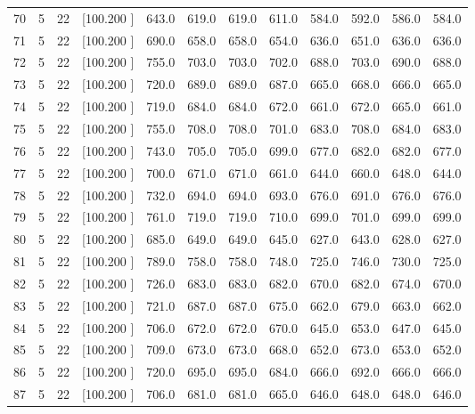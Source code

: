 \documentclass[12pt,a4paper]{article}
\begin{document}
\begin{center}
{\begin{tabular}{r r r r r r r r r r r r}
  70&  5& 22&[100.200   ]&   643.0&   619.0&   619.0&   611.0&   584.0&   592.0&   586.0&   584.0\\[-0.02in]
  71&  5& 22&[100.200   ]&   690.0&   658.0&   658.0&   654.0&   636.0&   651.0&   636.0&   636.0\\[-0.02in]
  72&  5& 22&[100.200   ]&   755.0&   703.0&   703.0&   702.0&   688.0&   703.0&   690.0&   688.0\\[-0.02in]
  73&  5& 22&[100.200   ]&   720.0&   689.0&   689.0&   687.0&   665.0&   668.0&   666.0&   665.0\\[-0.02in]
  74&  5& 22&[100.200   ]&   719.0&   684.0&   684.0&   672.0&   661.0&   672.0&   665.0&   661.0\\[-0.02in]
  75&  5& 22&[100.200   ]&   755.0&   708.0&   708.0&   701.0&   683.0&   708.0&   684.0&   683.0\\[-0.02in]
  76&  5& 22&[100.200   ]&   743.0&   705.0&   705.0&   699.0&   677.0&   682.0&   682.0&   677.0\\[-0.02in]
  77&  5& 22&[100.200   ]&   700.0&   671.0&   671.0&   661.0&   644.0&   660.0&   648.0&   644.0\\[-0.02in]
  78&  5& 22&[100.200   ]&   732.0&   694.0&   694.0&   693.0&   676.0&   691.0&   676.0&   676.0\\[-0.02in]
  79&  5& 22&[100.200   ]&   761.0&   719.0&   719.0&   710.0&   699.0&   701.0&   699.0&   699.0\\[-0.02in]
  80&  5& 22&[100.200   ]&   685.0&   649.0&   649.0&   645.0&   627.0&   643.0&   628.0&   627.0\\[-0.02in]
  81&  5& 22&[100.200   ]&   789.0&   758.0&   758.0&   748.0&   725.0&   746.0&   730.0&   725.0\\[-0.02in]
  82&  5& 22&[100.200   ]&   726.0&   683.0&   683.0&   682.0&   670.0&   682.0&   674.0&   670.0\\[-0.02in]
  83&  5& 22&[100.200   ]&   721.0&   687.0&   687.0&   675.0&   662.0&   679.0&   663.0&   662.0\\[-0.02in]
  84&  5& 22&[100.200   ]&   706.0&   672.0&   672.0&   670.0&   645.0&   653.0&   647.0&   645.0\\[-0.02in]
  85&  5& 22&[100.200   ]&   709.0&   673.0&   673.0&   668.0&   652.0&   673.0&   653.0&   652.0\\[-0.02in]
  86&  5& 22&[100.200   ]&   720.0&   695.0&   695.0&   684.0&   666.0&   692.0&   666.0&   666.0\\[-0.02in]
  87&  5& 22&[100.200   ]&   706.0&   681.0&   681.0&   665.0&   646.0&   648.0&   648.0&   646.0\\[-0.02in]

\end{tabular}}
\end{center}
\end{document}
